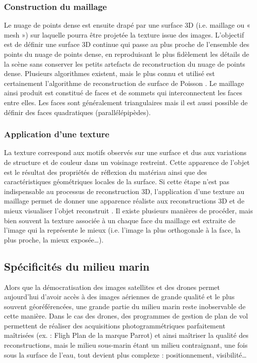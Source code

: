 \subsubsection{Construction du maillage}

Le nuage de points dense est ensuite drapé par une surface 3D (i.e. maillage ou « mesh ») sur laquelle pourra être projetée la texture issue des images. L’objectif est de définir une surface 3D continue qui passe au plus proche de l’ensemble des points du nuage de points dense, en reproduisant le plus fidèlement les détails de la scène sans conserver les petits artefacts de reconstruction du nuage de points dense. Plusieurs algorithmes existent, mais le plus connu et utilisé est certainement l’algorithme de reconstruction de surface de Poisson \citep{kazhdan_poisson_2006}. Le maillage ainsi produit est constitué de faces et de sommets qui interconnectent les faces entre elles. Les faces sont généralement triangulaires mais il est aussi possible de définir des faces quadratiques (parallélépipèdes).

\subsubsection{Application d’une texture}

La texture correspond aux motifs observés sur une surface et dus aux variations de structure et de couleur dans un voisinage restreint. Cette apparence de l’objet est le résultat des propriétés de réflexion du matériau ainsi que des caractéristiques géométriques locales de la surface. Si cette étape n’est pas indispensable au processus de reconstruction 3D, l’application d’une texture au maillage permet de donner une apparence réaliste aux reconstructions 3D et de mieux visualiser l’objet reconstruit \citep{luhmann_close-range_2014}. Il existe plusieurs manières de procéder, mais bien souvent la texture associée à un chaque face du maillage est extraite de l’image qui la représente le mieux (i.e. l’image la plus orthogonale à la face, la plus proche, la mieux exposée…).

\subsection{Spécificités du milieu marin}

Alors que la démocratisation des images satellites et des drones permet aujourd’hui d’avoir accès à des images aériennes de grande qualité et le plus souvent géoréférencées, une grande partie du milieu marin reste inobservable de cette manière. Dans le cas des drones, des programmes de gestion de plan de vol permettent de réaliser des acquisitions photogrammétriques parfaitement maîtrisées (ex. : Fligh Plan de la marque Parrot) et ainsi maîtriser la qualité des reconstructions, mais le milieu sous-marin étant un milieu contraignant, une fois sous la surface de l’eau, tout devient plus complexe : positionnement, visibilité…

